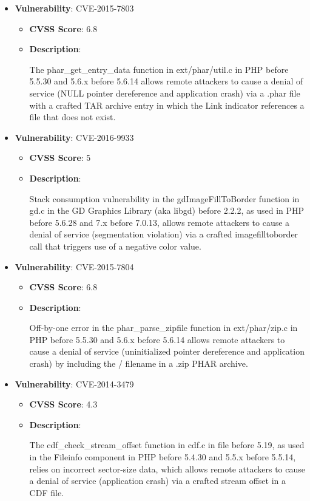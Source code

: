 \documentclass{article}
\begin{document}
\begin{itemize}
        \item \textbf{Vulnerability}: CVE-2015-7803
        \begin{itemize}
            \item \textbf{CVSS Score}:  6.8 
            \item \textbf{Description}:
            \parbox[t]{0.9\linewidth}{
                \ttfamily The phar\_get\_entry\_data function in ext/phar/util.c in PHP before 5.5.30 and 5.6.x before 5.6.14 allows remote attackers to cause a denial of service (NULL pointer dereference and application crash) via a .phar file with a crafted TAR archive entry in which the Link indicator references a file that does not exist.
            }
        \end{itemize}
    
        \item \textbf{Vulnerability}: CVE-2016-9933
        \begin{itemize}
            \item \textbf{CVSS Score}:  5 
            \item \textbf{Description}:
            \parbox[t]{0.9\linewidth}{
                \ttfamily Stack consumption vulnerability in the gdImageFillToBorder function in gd.c in the GD Graphics Library (aka libgd) before 2.2.2, as used in PHP before 5.6.28 and 7.x before 7.0.13, allows remote attackers to cause a denial of service (segmentation violation) via a crafted imagefilltoborder call that triggers use of a negative color value.
            }
        \end{itemize}
    
        \item \textbf{Vulnerability}: CVE-2015-7804
        \begin{itemize}
            \item \textbf{CVSS Score}:  6.8 
            \item \textbf{Description}:
            \parbox[t]{0.9\linewidth}{
                \ttfamily Off-by-one error in the phar\_parse\_zipfile function in ext/phar/zip.c in PHP before 5.5.30 and 5.6.x before 5.6.14 allows remote attackers to cause a denial of service (uninitialized pointer dereference and application crash) by including the / filename in a .zip PHAR archive.
            }
        \end{itemize}
    
        \item \textbf{Vulnerability}: CVE-2014-3479
        \begin{itemize}
            \item \textbf{CVSS Score}:  4.3 
            \item \textbf{Description}:
            \parbox[t]{0.9\linewidth}{
                \ttfamily The cdf\_check\_stream\_offset function in cdf.c in file before 5.19, as used in the Fileinfo component in PHP before 5.4.30 and 5.5.x before 5.5.14, relies on incorrect sector-size data, which allows remote attackers to cause a denial of service (application crash) via a crafted stream offset in a CDF file.
            }
        \end{itemize}
    

\end{itemize}
\end{document}
